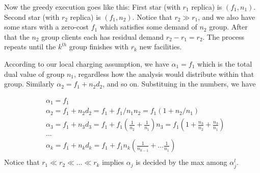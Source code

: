 \documentclass[11pt]{article}
\begin{document}
Now the greedy execution goes like this: First star (with $r_1$
replica) is $(f_1, n_1)$.  Second star (with $r_2$ replica) is $(f_1,
n_2)$. Notice that $r_2 \gg r_1$, and we also have some stars with a
zero-cost $f_1$ which satisfies some demand of $n_2$ group. After that
the $n_2$ group clients each has residual demand $r_2 - r_1 =
r_2$. The process repeats until the $k^{th}$ group finishes with $r_k$
new facilities.

According to our local charging assumption, we have $\alpha_1 = f_1$
which is the total dual value of group $n_1$, regardless how the
analysis would distribute within that group. Similarly $\alpha_2 = f_1
+ n_2 d_2$, and so on. Substituing in the numbers, we have

\begin{align*}
  &\alpha_1 = f_1\\
  &\alpha_2 = f_1 + n_2 d_2 = f_1 + f_1/n_1 n_2 = f_1 (1 + n_2 /
  n_1)\\
  &\alpha_3 = f_1 + n_3 d_3 = f_1 + f_1 (\frac{1}{n_2} +
  \frac{1}{n_1}) n_3 = f_1 (1 + \frac{n_3}{n_2} + \frac{n_3}{n_1})\\
  &\ldots\\
  &\alpha_k = f_1 + n_k d_k = f_1 + f_1 n_k (\frac{1}{n_{k-1}} + \ldots
  \frac{1}{n_1})\\
\end{align*}
Notice that $r_1 \ll r_2 \ll \ldots \ll r_k$ implies $\alpha_j$ is
decided by the max among $\alpha_j^l$.
\end{document}
